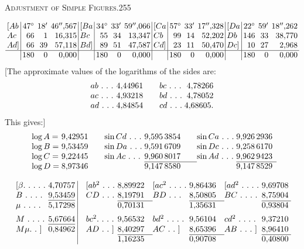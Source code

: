 \clearpage
\noindent\mbox{}\hfill\textsc{Adjustment of Simple Figures.}\hfill255\par\medskip
\[
\setlength{\arraycolsep}{2pt}
\begin{array}{l|rrr|l|rrr|l|rrr|l|rrr}
[Ab&47^\circ&18'&46''{,}567&[Ba&34^\circ&33'&59''{,}066&[Ca&57^\circ&33'&17''{,}328&[Da&22^\circ&59'&18''{,}262\\
Ac&66&1&16{,}315&Bc&55&34&13{,}347&Cb&99&14&52{,}202&Db&146&33&38{,}770\\
Ad]&66&39&57{,}118&Bd]&89&51&47{,}587&Cd]&23&11&50{,}470&Dc]&10&27&2{,}968\\ \hline
&180&0&0{,}000&&180&0&0{,}000&&180&0&0{,}000&&180&0&0{,}000
\end{array}
\]
[The approximate values of the logarithms of the sides are:
\[
\begin{array}{l@{\;}r@{\qquad}l@{\;}r}
ab\ .\ .\ .&4{,}44961&bc\ .\ .\ .&4{,}78266\\
ac\ .\ .\ .&4{,}93218&bd\ .\ .\ .&4{,}78052\\
ad\ .\ .\ .&4{,}84854&cd\ .\ .\ .&4{,}68605.
\end{array}
\]
This gives:]
\[
\begin{array}{l@{\;}r@{\qquad}l@{\;}r@{\qquad}l@{\;}r}
\log A=&9{,}42951&\sin Cd\ .\ .\ .&9{,}595\,3854&\sin Ca\ .\ .\ .&9{,}926\,2936\\
\log B=&9{,}53459&\sin Da\ .\ .\ .&9{,}591\,6709&\sin Dc\ .\ .\ .&9{,}258\,6170\\
\log C=&9{,}22445&\sin Ac\ .\ .\ .&9{,}960\,8017&\sin Ad\ .\ .\ .&9{,}962\,9423\\ \cline{4-4}\cline{6-6}
\log D=&8{,}97346&&9{,}147\,8580&&9{,}147\,8529
\end{array}
\]
\noindent\makebox[\linewidth][c]{\hspace{.27\linewidth}$[\beta=0{,}000\,0051]$}\par\medskip
\[
\setlength{\arraycolsep}{3pt}
\begin{array}{l@{}r|@{\quad}l@{}r@{\quad}l@{}r@{\quad}l@{}r}
[\beta.\ .\ .\ .\ .\ &4{,}70757&[ab^2\ .\ .\ .\ &8{,}89922&[ac^2\ .\ .\ .\ .\ &\rlap{\raisebox{1.5ex}{\text{\tiny.}}}9{,}86436&[ad^2\ .\ .\ .\ .\ &9{,}69708\\
B\ .\ .\ .\ .\ &\underline{9{,}53459}&CD\ .\ .\ .\ &8{,}19791&BD\ .\ .\ .\ &8{,}50805&BC\ .\ .\ .\ .\ &8{,}75904\\ \cline{4-4}\cline{6-6}\cline{8-8}
\mu\ .\ .\ .\ .\ &5{,}17298&&0{,}70131&&1{,}35631&&0{,}93804\\[5pt]
M\ .\ .\ .\ .\ &\underline{5{,}67664}&bc^2.\ .\ .\ .\ &9{,}56532&bd^2\ .\ .\ .\ .\ &9{,}56104&cd^2\ .\ .\ .\ .\ &9{,}37210\\ 
M\mu.\ .\ ]&0{,}84962&AD\ .\ .\ ]&8{,}40297&AC\ .\ .\ ]&8{,}65396&AB\ .\ .\ .\ ]&8{,}96410\\ \cline{4-4}\cline{6-6}\cline{8-8}
&&&1{,}16235&&0{,}90708&&0{,}40800
\end{array}
\]
